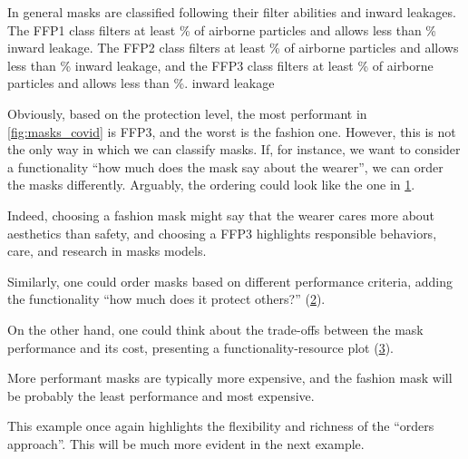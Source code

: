 In general masks are classified following their filter abilities and inward leakages.
The FFP1 class filters at least \unit[80]{\%} of airborne particles and allows less than \unit[22]{\%} inward leakage.
The FFP2 class filters at least \unit[96]{\%} of airborne particles and allows less than \unit[8]{\%} inward leakage, and the FFP3 class filters at least \unit[99]{\%} of airborne particles and allows less than \unit[2]{\%}. inward leakage

Obviously, based on the protection level, the most performant in \cref{fig:masks_covid} is FFP3, and the worst is the fashion one.
However, this is not the only way in which we can classify masks.
If, for instance, we want to consider a functionality ``how much does the mask say about the wearer'', we can order the masks differently.
Arguably, the ordering could look like the one in \cref{fig:masks_expressive}.

\begin{figure}[h!]
    \centering
    \caption{}
    \label{fig:masks_expressive}
\end{figure}

Indeed, choosing a fashion mask might say that the wearer cares more about aesthetics than safety, and choosing a FFP3 highlights responsible behaviors, care, and research in masks models.

Similarly, one could order masks based on different performance criteria, adding the functionality ``how much does it protect others?'' (\cref{fig:masks_others}).

\begin{figure}[h!]
    \centering
    \caption{}
    \label{fig:masks_others}
\end{figure}

On the other hand, one could think about the trade-offs between the mask performance and its cost, presenting a functionality-resource plot (\cref{fig:masks_price}).

\begin{figure}[h!]
    \centering
    \caption{}
    \label{fig:masks_price}
\end{figure}

More performant masks are typically more expensive, and the fashion mask will be probably the least performance and most expensive.

This example once again highlights the flexibility and richness of the ``orders approach''.
This will be much more evident in the next example.


